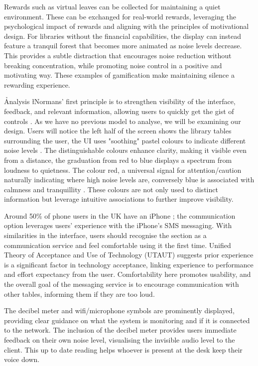 \documentclass{novel}
\begin{document}
Rewards such as virtual leaves can be collected for maintaining a quiet environment. These can be exchanged for real-world rewards, leveraging the psychological impact of rewards and aligning with the principles of motivational design. For libraries without the financial capabilities, the display can instead feature a tranquil forest that becomes more animated as noise levels decrease. This provides a subtle distraction that encourages noise reduction without breaking concentration, while promoting noise control in a positive and motivating way. These examples of gamification \citep{deterding_game_2011} make maintaining silence a rewarding experience.

\h{Analysis}
\l{N}ormans' first principle is to strengthen visibility of the interface, feedback, and relevant information, allowing users to quickly get the gist of controls \citep{norman_design_1988}. As we have no previous model to analyse, we will be examining our design. Users will notice the left half of the screen shows the library tables surrounding the user, the UI uses "soothing" pastel colours to indicate different noise levels \citep{clark_house_2003}. The distinguishable colours enhance clarity, making it visible even from a distance, the graduation from red to blue displays a spectrum from loudness to quietness. The colour red, a universal signal for attention/caution naturally indicating where high noise levels are, conversely blue is associated with calmness and tranquillity \citep{fipps_psychology_2003}. These colours are not only used to distinct information but leverage intuitive associations to further improve visibility.

Around 50\% of phone users in the UK have an iPhone \citep{kunsts_iphone_2024}; the communication option leverages users' experience with the iPhone's SMS messaging. With similarities in the interface, users should recognise the section as a communication service and feel comfortable using it the first time. Unified Theory of Acceptance and Use of Technology (UTAUT) suggests prior experience is a significant factor in technology acceptance, linking experience to performance and effort expectancy from the user. Comfortability here promotes usability, and the overall goal of the messaging service is to encourage communication with other tables, informing them if they are too loud.

The decibel meter and wifi/microphone symbols are prominently displayed, providing clear guidance on what the system is monitoring and if it is connected to the network. The inclusion of the decibel meter provides users immediate feedback on their own noise level, visualising the invisible audio level to the client. This up to date reading helps whoever is present at the desk keep their voice down. 
\end{document}
